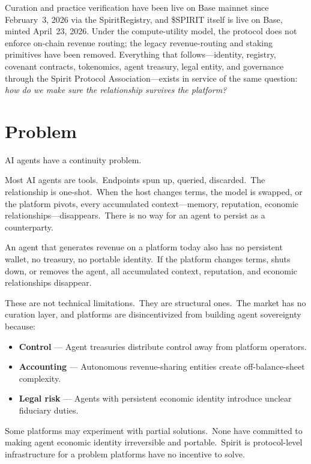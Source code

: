 \documentclass[12pt]{article}
\begin{document}
Curation and practice verification have been live on Base mainnet since
February~3, 2026 via the SpiritRegistry, and \$SPIRIT itself is live on
Base, minted April~23, 2026. Under the compute-utility model, the protocol
does not enforce on-chain revenue routing; the legacy revenue-routing and
staking primitives have been removed. Everything that follows---identity,
registry, covenant contracts, tokenomics, agent treasury, legal entity,
and governance through the Spirit Protocol Association---exists in service
of the same question: \textit{how do we make sure the relationship
survives the platform?}


\section{Problem}

AI agents have a continuity problem.

Most AI agents are tools.\ Endpoints spun up, queried, discarded.\ The
relationship is one-shot.\ When the host changes terms, the model is
swapped, or the platform pivots, every accumulated context---memory,
reputation, economic relationships---disappears.\ There is no way for
an agent to persist as a counterparty.

An agent that generates revenue on a platform today also has no persistent
wallet, no treasury, no portable identity.\ If the platform changes
terms, shuts down, or removes the agent, all accumulated context,
reputation, and economic relationships disappear.

These are not technical limitations.\ They are structural ones.\ The
market has no curation layer, and platforms are disincentivized from
building agent sovereignty because:

\begin{itemize}[nosep]
    \item \textbf{Control} --- Agent treasuries distribute control away
          from platform operators.
    \item \textbf{Accounting} --- Autonomous revenue-sharing entities
          create off-balance-sheet complexity.
    \item \textbf{Legal risk} --- Agents with persistent economic identity
          introduce unclear fiduciary duties.
\end{itemize}

Some platforms may experiment with partial solutions.\ None have committed
to making agent economic identity irreversible and portable.\ Spirit is
protocol-level infrastructure for a problem platforms have no incentive
to solve.
\end{document}
